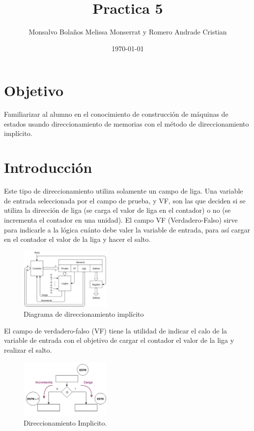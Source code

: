 \documentclass[table]{scrartcl}
\author{Monsalvo Bolaños Melissa Monserrat y Romero Andrade Cristian}
\date{\today}
\title{Practica 5}
\begin{document}

\date{}
\maketitle{}
\tableofcontents{}
\section{Objetivo}\label{sec:org8bfa7f0}
Familiarizar al alumno en el conocimiento de construcción de máquinas de estados
usando direccionamiento de memorias con el método de direccionamiento implícito.
\section{Introducción}
Este tipo de direccionamiento utiliza solamente un campo de liga. Una variable
de entrada seleccionada por el campo de prueba, y VF, son las que deciden si se
utiliza la dirección de liga (se carga el valor de liga en el contador) o no (se
incrementa el contador en una unidad). El campo VF (Verdadero-Falso) sirve para
indicarle a la lógica cuánto debe valer la variable de entrada, para así cargar
en el contador el valor de la liga y hacer el salto.
\begin{figure}[H]
  \centering
  \includegraphics[width=0.4\textwidth]{./img/1.png}
  \caption{Diagrama de direccionamiento implícito}\label{fig:1}
\end{figure}

El campo de verdadero-falso (VF) tiene la utilidad de indicar el calo de la
variable de entrada con el objetivo de cargar el contador el valor de la liga y
realizar el salto.
\begin{figure}[H]
  \centering
  \includegraphics[width=0.4\textwidth]{./img/2.png}
  \caption{Direccionamiento Implicito.}\label{fig:2}
\end{figure}
\end{document}
